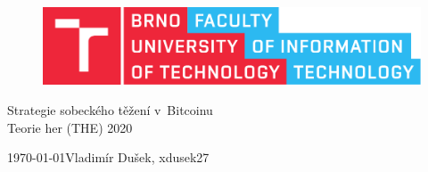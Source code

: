 \documentclass[12pt,a4paper]{article}
\begin{document}
\begin{titlepage}
    \begin{center}


        \begin{figure}[htb]
            \centering
            \includegraphics[width=0.85\hsize]{fitlogo.pdf}
        \end{figure}


        {\Huge Strategie sobeckého těžení v~Bitcoinu} \\
        \bigskip
        {\LARGE Teorie her (THE) 2020}

    \end{center}

    {\Large \today \hfill Vladimír Dušek, xdusek27}

\end{titlepage}



\tableofcontents
\newpage








\end{document}

